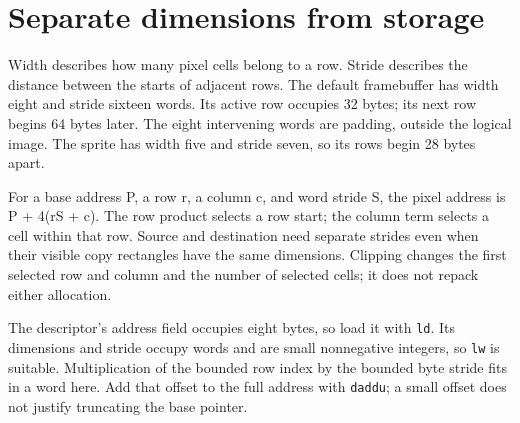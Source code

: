 \section{Separate dimensions from storage}\label{blit-storage}
Width describes how many pixel cells belong to a row. Stride describes the distance between the starts of adjacent rows. The default framebuffer has width eight and stride sixteen words. Its active row occupies 32 bytes; its next row begins 64 bytes later. The eight intervening words are padding, outside the logical image. The sprite has width five and stride seven, so its rows begin 28 bytes apart.

For a base address P, a row r, a column c, and word stride S, the pixel address is P + 4(rS + c). The row product selects a row start; the column term selects a cell within that row. Source and destination need separate strides even when their visible copy rectangles have the same dimensions. Clipping changes the first selected row and column and the number of selected cells; it does not repack either allocation.

The descriptor's address field occupies eight bytes, so load it with \texttt{ld}. Its dimensions and stride occupy words and are small nonnegative integers, so \texttt{lw} is suitable. Multiplication of the bounded row index by the bounded byte stride fits in a word here. Add that offset to the full address with \texttt{daddu}; a small offset does not justify truncating the base pointer.
